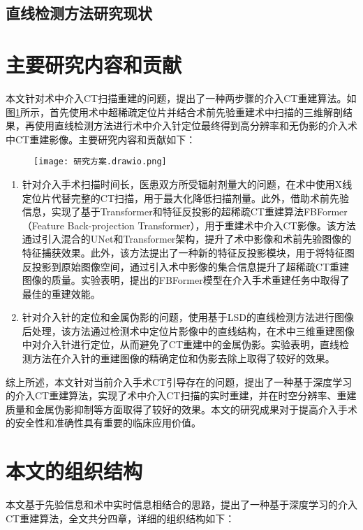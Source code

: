 \subsection{直线检测方法研究现状}
\section{主要研究内容和贡献}
本文针对术中介入CT扫描重建的问题，提出了一种两步骤的介入CT重建算法。如图\ref{fig. content}所示，首先使用术中超稀疏定位片并结合术前先验重建术中扫描的三维解剖结果，再使用直线检测方法进行术中介入针定位最终得到高分辨率和无伪影的介入术中CT重建影像。主要研究内容和贡献如下：

\begin{figure}[!htp]
  \centering
  \texttt{[image: 研究方案.drawio.png]}
  \label{fig. content}
\end{figure}

\begin{enumerate}
  \item 针对介入手术扫描时间长，医患双方所受辐射剂量大的问题，在术中使用X线定位片代替完整的CT扫描，用于最大化降低扫描剂量。此外，借助术前先验信息，实现了基于Transformer和特征反投影的超稀疏CT重建算法FBFormer（Feature Back-projection Transformer），用于重建术中介入CT影像。该方法通过引入混合的UNet和Transformer架构，提升了术中影像和术前先验图像的特征捕获效果。此外，该方法提出了一种新的特征反投影模块，用于将特征图反投影到原始图像空间，通过引入术中影像的集合信息提升了超稀疏CT重建图像的质量。实验表明，提出的FBFormer模型在介入手术重建任务中取得了最佳的重建效能。
  \item 针对介入针的定位和金属伪影的问题，使用基于LSD的直线检测方法进行图像后处理，该方法通过检测术中定位片影像中的直线结构，在术中三维重建图像中对介入针进行定位，从而避免了CT重建中的金属伪影。实验表明，直线检测方法在介入针的重建图像的精确定位和伪影去除上取得了较好的效果。 %
\end{enumerate}
综上所述，本文针对当前介入手术CT引导存在的问题，提出了一种基于深度学习的介入CT重建算法，实现了术中介入CT扫描的实时重建，并在时空分辨率、重建质量和金属伪影抑制等方面取得了较好的效果。本文的研究成果对于提高介入手术的安全性和准确性具有重要的临床应用价值。

\section{本文的组织结构}
本文基于先验信息和术中实时信息相结合的思路，提出了一种基于深度学习的介入CT重建算法，全文共分四章，详细的组织结构如下：

